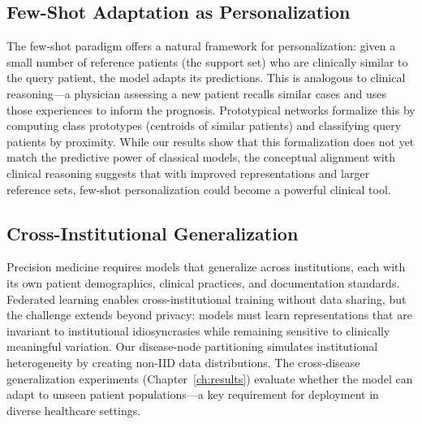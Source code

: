 \subsection{Few-Shot Adaptation as Personalization}

The few-shot paradigm offers a natural framework for personalization: given a small number of reference patients (the support set) who are clinically similar to the query patient, the model adapts its predictions. This is analogous to clinical reasoning---a physician assessing a new patient recalls similar cases and uses those experiences to inform the prognosis. Prototypical networks formalize this by computing class prototypes (centroids of similar patients) and classifying query patients by proximity. While our results show that this formalization does not yet match the predictive power of classical models, the conceptual alignment with clinical reasoning suggests that with improved representations and larger reference sets, few-shot personalization could become a powerful clinical tool.

\subsection{Cross-Institutional Generalization}

Precision medicine requires models that generalize across institutions, each with its own patient demographics, clinical practices, and documentation standards. Federated learning enables cross-institutional training without data sharing, but the challenge extends beyond privacy: models must learn representations that are invariant to institutional idiosyncrasies while remaining sensitive to clinically meaningful variation. Our disease-node partitioning simulates institutional heterogeneity by creating non-IID data distributions. The cross-disease generalization experiments (Chapter~\ref{ch:results}) evaluate whether the model can adapt to unseen patient populations---a key requirement for deployment in diverse healthcare settings.
